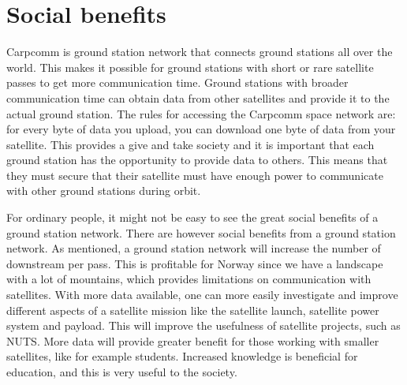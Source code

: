 \section{Social benefits}

Carpcomm is ground station network that connects ground stations all over the world. This makes it possible for ground stations with short or rare satellite passes to get more communication time. Ground stations with broader communication time can obtain data from other satellites and provide it to the actual ground station. The rules for accessing the Carpcomm space network are: for every byte of data you upload, you can download one byte of data from your satellite. This provides a give and take society and it is important that each ground station has the opportunity to provide data to others. This means that they must secure that their satellite must have enough power to communicate with other ground stations during orbit. 


For ordinary people, it might not be easy to see the great social benefits of a ground station network. There are however social benefits from a ground station network. As mentioned, a ground station network will increase the number of downstream per pass. This is profitable for Norway since we have a landscape with a lot of mountains, which provides limitations on communication with satellites. With more data available, one can more easily investigate and improve different aspects of a satellite mission like the satellite launch, satellite power system and payload. This will improve the usefulness of satellite projects, such as NUTS. More data will provide greater benefit for those working with smaller satellites, like for example students. Increased knowledge is beneficial for education, and this is very useful to the society.
